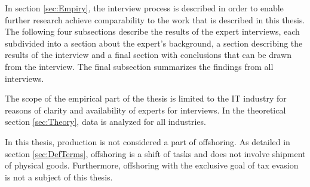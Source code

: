 In section \ref{sec:Empiry}, the interview process is described in order to enable further research achieve comparability to the work that is described in this thesis. The following four subsections describe the results of the expert interviews, each subdivided into a section about the expert's background, a section describing the results of the interview and a final section with conclusions that can be drawn from the interview. The final subsection summarizes the findings from all interviews.

The scope of the empirical part of the thesis is limited to the IT industry for reasons of clarity and availability of experts for interviews. In the theoretical section \ref{sec:Theory}, data is analyzed for all industries.

In this thesis, production is not considered a part of offshoring. As detailed in section \ref{sec:DefTerms}, offshoring is a shift of tasks and does not involve shipment of physical goods. Furthermore, offshoring with the exclusive goal of tax evasion is not a subject of this thesis.

